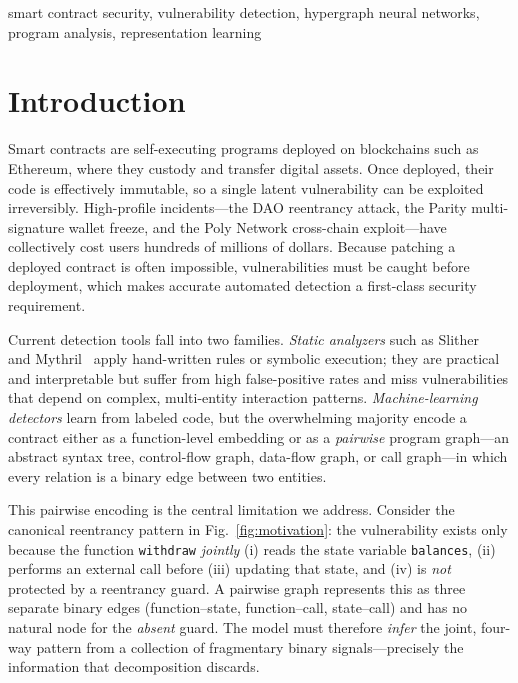 \documentclass[conference]{IEEEtran}
\begin{document}
\begin{IEEEkeywords}
smart contract security, vulnerability detection, hypergraph neural networks,
program analysis, representation learning
\end{IEEEkeywords}

\section{Introduction}

Smart contracts are self-executing programs deployed on blockchains such as Ethereum,
where they custody and transfer digital assets. Once deployed, their code is
effectively immutable, so a single latent vulnerability can be exploited
irreversibly. High-profile incidents---the DAO reentrancy attack, the Parity
multi-signature wallet freeze, and the Poly Network cross-chain exploit---have
collectively cost users hundreds of millions of dollars. Because patching a deployed
contract is often impossible, vulnerabilities must be caught before deployment,
which makes accurate automated detection a first-class security requirement.

Current detection tools fall into two families. \emph{Static analyzers} such as
Slither~\cite{feist2019slither} and Mythril~\cite{mueller2018mythril} apply
hand-written rules or symbolic execution; they are practical and interpretable but
suffer from high false-positive rates and miss vulnerabilities that depend on
complex, multi-entity interaction patterns. \emph{Machine-learning detectors} learn
from labeled code, but the overwhelming majority encode a contract either as a
function-level embedding or as a \emph{pairwise} program graph---an abstract syntax
tree, control-flow graph, data-flow graph, or call graph---in which every relation
is a binary edge between two entities.

This pairwise encoding is the central limitation we address. Consider the canonical
reentrancy pattern in Fig.~\ref{fig:motivation}: the vulnerability exists only because
the function \texttt{withdraw} \emph{jointly} (i) reads the state variable
\texttt{balances}, (ii) performs an external call before (iii) updating that state,
and (iv) is \emph{not} protected by a reentrancy guard. A pairwise graph represents
this as three separate binary edges (function--state, function--call, state--call)
and has no natural node for the \emph{absent} guard. The model must therefore
\emph{infer} the joint, four-way pattern from a collection of fragmentary binary
signals---precisely the information that decomposition discards.
\end{document}
